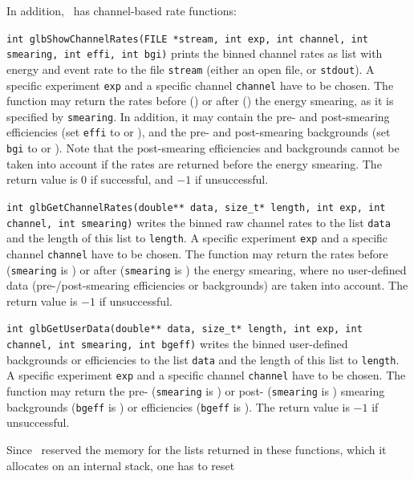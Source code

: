 In addition, \GLOBES\ has channel-based rate functions:
\begin{function}
{\tt int glbShowChannelRates(FILE *stream,
int exp, int channel, int smearing, int effi, int bgi)}
prints the binned channel rates as
list with energy and event rate to the file {\tt stream} (either an
open file, or {\tt stdout}). A specific experiment {\tt exp} and a 
specific channel {\tt channel} have to be chosen.
The function may return
the rates before () or after ()
the energy smearing, as it is specified by {\tt smearing}.
In addition, it may contain the pre- and post-smearing efficiencies (set
{\tt effi} to  or ), and the
pre- and post-smearing backgrounds (set
{\tt bgi} to  or ). Note that
the post-smearing efficiencies and backgrounds cannot be taken into
account if the rates are returned before the energy smearing.
The return value
is $0$ if successful, and $-1$ if unsuccessful.
\end{function}
\begin{function}
{\tt int glbGetChannelRates(double** data,
size\_t* length, int exp, int channel, int smearing)}
writes the binned raw channel rates to the list {\tt data}
and the length of this list to {\tt length}. 
A specific experiment {\tt exp} and a 
specific channel {\tt channel} have to be chosen.
The function may return
the rates before ({\tt smearing} is ) or after ({\tt smearing} is )
the energy smearing, where no user-defined data
(pre-/post-smearing efficiencies or backgrounds) are taken into account.
The return value is $-1$ if unsuccessful.
\end{function}
\begin{function}
{\tt int glbGetUserData(double** data,
size\_t* length, int exp, int channel, int smearing, int bgeff)}
writes the binned user-defined backgrounds or efficiencies 
to the list {\tt data} and the length of this list to {\tt length}. 
A specific experiment {\tt exp} and a 
specific channel {\tt channel} have to be chosen.
The function may return
the pre- ({\tt smearing} is ) or post- ({\tt smearing} is ) smearing backgrounds ({\tt bgeff} is ) 
or efficiencies ({\tt bgeff} is ). 
The return value is $-1$ if unsuccessful.
\end{function}
Since \GLOBES\ reserved the memory for the lists returned in these
functions, which it allocates on an internal stack, one has to reset
